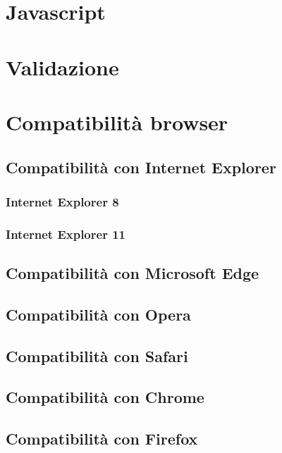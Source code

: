 \documentclass[10pt, a4paper]{article}
\begin{document}
\section{Javascript}

\section{Validazione}

\section{Compatibilità browser}

\subsection{Compatibilità con Internet Explorer}

\subsubsection{Internet Explorer 8}

\subsubsection{Internet Explorer 11}

\subsection{Compatibilità con Microsoft Edge}

\subsection{Compatibilità con Opera}

\subsection{Compatibilità con Safari}

\subsection{Compatibilità con Chrome}

\subsection{Compatibilità con Firefox}
\end{document}
